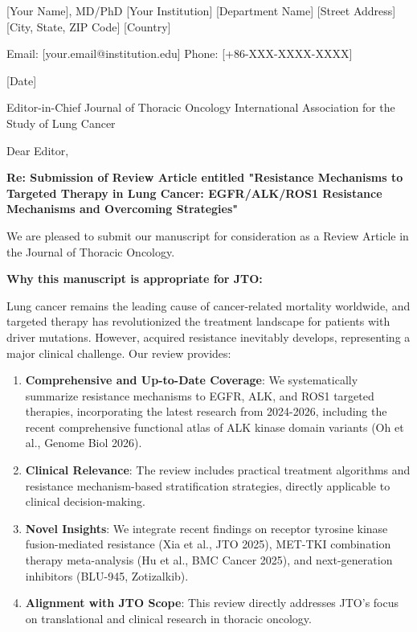 
[Your Name], MD/PhD
[Your Institution]
[Department Name]
[Street Address]
[City, State, ZIP Code]
[Country]

Email: [your.email@institution.edu]
Phone: [+86-XXX-XXXX-XXXX]

[Date]

Editor-in-Chief
Journal of Thoracic Oncology
International Association for the Study of Lung Cancer

Dear Editor,

\textbf{Re: Submission of Review Article entitled "Resistance Mechanisms to Targeted Therapy in Lung Cancer: EGFR/ALK/ROS1 Resistance Mechanisms and Overcoming Strategies"}

We are pleased to submit our manuscript for consideration as a Review Article in the Journal of Thoracic Oncology.

\textbf{Why this manuscript is appropriate for JTO:}

Lung cancer remains the leading cause of cancer-related mortality worldwide, and targeted therapy has revolutionized the treatment landscape for patients with driver mutations. However, acquired resistance inevitably develops, representing a major clinical challenge. Our review provides:

\begin{enumerate}
    \item \textbf{Comprehensive and Up-to-Date Coverage}: We systematically summarize resistance mechanisms to EGFR, ALK, and ROS1 targeted therapies, incorporating the latest research from 2024-2026, including the recent comprehensive functional atlas of ALK kinase domain variants (Oh et al., Genome Biol 2026).
    
    \item \textbf{Clinical Relevance}: The review includes practical treatment algorithms and resistance mechanism-based stratification strategies, directly applicable to clinical decision-making.
    
    \item \textbf{Novel Insights}: We integrate recent findings on receptor tyrosine kinase fusion-mediated resistance (Xia et al., JTO 2025), MET-TKI combination therapy meta-analysis (Hu et al., BMC Cancer 2025), and next-generation inhibitors (BLU-945, Zotizalkib).
    
    \item \textbf{Alignment with JTO Scope}: This review directly addresses JTO's focus on translational and clinical research in thoracic oncology.
\end{enumerate}

